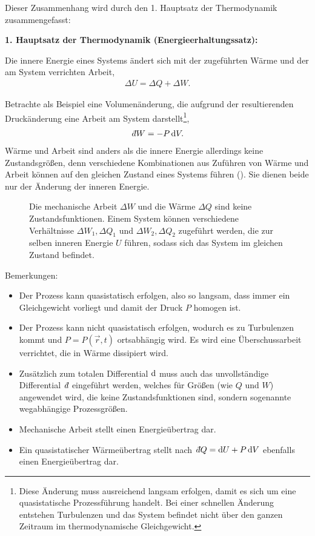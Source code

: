 Dieser Zusammenhang wird durch den 1. Hauptsatz der Thermodynamik zusammengefasst:
\begin{formal}
    \textbf{1. Hauptsatz der Thermodynamik (Energieerhaltungssatz):}

    Die innere Energie eines Systems ändert sich mit der zugeführten Wärme und der am System verrichten Arbeit,
    \begin{align*}
        \Delta U = \Delta Q + \Delta W.
    \end{align*}
\end{formal}

Betrachte als Beispiel eine Volumenänderung, die aufgrund der resultierenden Druckänderung eine Arbeit am System darstellt\footnote{Diese Änderung muss ausreichend langsam erfolgen, damit es sich um eine quasistatische Prozessführung handelt. Bei einer schnellen Änderung entstehen Turbulenzen und das System befindet nicht über den ganzen Zeitraum im thermodynamische Gleichgewicht.},
\begin{align*}
    \udiff W = -P\diff V.
\end{align*}
Wärme und Arbeit sind anders als die innere Energie allerdings keine Zustandsgrößen, denn verschiedene Kombinationen aus Zuführen von Wärme und Arbeit können auf den gleichen Zustand eines Systems führen (). Sie dienen beide nur der Änderung der inneren Energie.

\begin{figure}[htb]
    \centering
    \tfigWQAreNoStateFunctions
    \caption{Die mechanische Arbeit $\Delta W$ und die Wärme $\Delta Q$ sind keine Zustandsfunktionen. Einem System können verschiedene Verhältnisse $\Delta W_1,\Delta Q_1$ und $\Delta W_2,\Delta Q_2$ zugeführt werden, die zur selben inneren Energie $U$ führen, sodass sich das System im gleichen Zustand befindet. }
    \label{fig:WQAreNoStateFunctions}
\end{figure}


Bemerkungen:
\begin{itemize}
    \item Der Prozess kann quasistatisch erfolgen, also so langsam, dass immer ein Gleichgewicht vorliegt und damit der Druck $P$ homogen ist.
    \item Der Prozess kann nicht quasistatisch erfolgen, wodurch es zu Turbulenzen kommt und $P=P(\vec r,t)$ ortsabhängig wird. Es wird eine Überschussarbeit verrichtet, die in Wärme dissipiert wird.
    \item Zusätzlich zum totalen Differential $\mathop{}\!\mathrm{d}$ muss auch das unvollständige Differential $\udiff$ eingeführt werden, welches für Größen (wie $Q$ und $W$) angewendet wird, die keine Zustandsfunktionen sind, sondern sogenannte wegabhängige Prozessgrößen.
    \item Mechanische Arbeit stellt einen Energieübertrag dar.
    \item Ein quasistatischer Wärmeübertrag stellt nach $\udiff Q=\diff U+P\diff V$ ebenfalls einen Energieübertrag dar.
\end{itemize}



